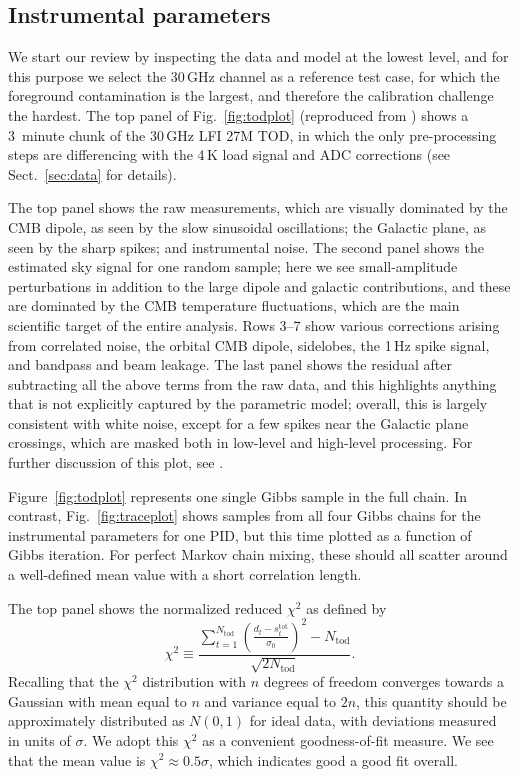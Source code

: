 \documentclass[twocolumn]{aa}
\begin{document}
\subsection{Instrumental parameters}
\label{sec:tod_params}

We start our review by inspecting the data and model at the lowest
level, and for this purpose we select the 30\,GHz channel as a
reference test case, for which the foreground contamination is the
largest, and therefore the calibration challenge the hardest. The top
panel of Fig.~\ref{fig:todplot} (reproduced from \citealp{bp10}) shows
a 3~minute chunk of the 30\,GHz LFI 27M TOD, in which the only
pre-processing steps are differencing with the 4\,K load signal and
ADC corrections (see Sect.~\ref{sec:data} for details).

The top panel shows the raw measurements, which are visually dominated
by the CMB dipole, as seen by the slow sinusoidal oscillations; the
Galactic plane, as seen by the sharp spikes; and instrumental
noise. The second panel shows the estimated sky signal for one random
sample; here we see small-amplitude perturbations in addition to the
large dipole and galactic contributions, and these are dominated by
the CMB temperature fluctuations, which are the main scientific target
of the entire analysis. Rows 3--7 show various corrections arising
from correlated noise, the orbital CMB dipole, sidelobes, the 1\,Hz
spike signal, and bandpass and beam leakage. The last panel shows the
residual after subtracting all the above terms from the raw data,
and this highlights anything that is not explicitly captured by the
parametric model; overall, this is largely consistent with white
noise, except for a few spikes near the Galactic plane crossings,
which are masked both in low-level and high-level processing. For
further discussion of this plot, see \citet{bp10}.


Figure~\ref{fig:todplot} represents one single Gibbs sample in the
full chain. In contrast, Fig.~\ref{fig:traceplot} shows samples from
all four Gibbs chains for the instrumental parameters for one PID, but
this time plotted as a function of Gibbs iteration. For perfect Markov
chain mixing, these should all scatter around a well-defined mean
value with a short correlation length.

The top panel shows the normalized reduced $\chi^2$ as defined by
\begin{equation}
\chi^2 \equiv \frac{\sum_{t=1}^{N_{\mathrm{tod}}} \left(\frac{d_t - s_t^{\mathrm{tot}}}{\sigma_0}
  \right)^2 - N_{\mathrm{tod}}}{\sqrt{2N_{\mathrm{tod}}}}.
\label{eq:redchisq}
\end{equation}
Recalling that the $\chi^2$ distribution with $n$ degrees of freedom
converges towards a Gaussian with mean equal to $n$ and variance equal
to $2n$, this quantity should be approximately distributed as $N(0,1)$
for ideal data, with deviations measured in units of $\sigma$. We
adopt this $\chi^2$ as a convenient goodness-of-fit measure. We see
that the mean value is $\chi^2 \approx 0.5\sigma$, which indicates
good a good fit overall. 
\end{document}
